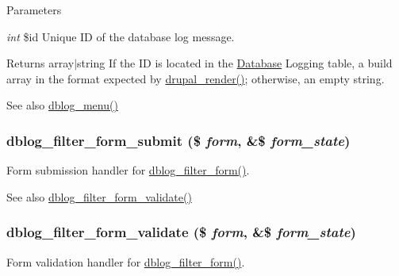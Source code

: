 \begin{DoxyParams}{Parameters}
\item[{\em int}]\$id Unique ID of the database log message.\end{DoxyParams}
\begin{DoxyReturn}{Returns}
array$|$string If the ID is located in the \hyperlink{classDatabase}{Database} Logging table, a build array in the format expected by \hyperlink{common_8inc_a05798b44e8d6c496d4bee5cc32fa7851}{drupal\_\-render()}; otherwise, an empty string.
\end{DoxyReturn}
\begin{DoxySeeAlso}{See also}
\hyperlink{dblog_8module_ac599cb2337e45bf5268f593e84039684}{dblog\_\-menu()} 
\end{DoxySeeAlso}
\hypertarget{dblog_8admin_8inc_a817953760089fe9caf59d187d3784433}{
\subsubsection[{dblog\_\-filter\_\-form\_\-submit}]{\setlength{\rightskip}{0pt plus 5cm}dblog\_\-filter\_\-form\_\-submit (\$ {\em form}, \/  \&\$ {\em form\_\-state})}}
\label{dblog_8admin_8inc_a817953760089fe9caf59d187d3784433}
Form submission handler for \hyperlink{group__forms_ga1baa51b833eb4a3831b4319d4c20ad19}{dblog\_\-filter\_\-form()}.

\begin{DoxySeeAlso}{See also}
\hyperlink{dblog_8admin_8inc_a8f88e6f1bf9010761546bbad59189b0f}{dblog\_\-filter\_\-form\_\-validate()} 
\end{DoxySeeAlso}
\hypertarget{dblog_8admin_8inc_a8f88e6f1bf9010761546bbad59189b0f}{
\subsubsection[{dblog\_\-filter\_\-form\_\-validate}]{\setlength{\rightskip}{0pt plus 5cm}dblog\_\-filter\_\-form\_\-validate (\$ {\em form}, \/  \&\$ {\em form\_\-state})}}
\label{dblog_8admin_8inc_a8f88e6f1bf9010761546bbad59189b0f}
Form validation handler for \hyperlink{group__forms_ga1baa51b833eb4a3831b4319d4c20ad19}{dblog\_\-filter\_\-form()}.

